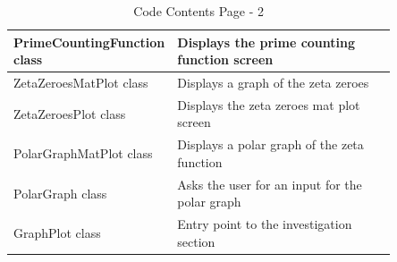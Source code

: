 \documentclass[12pt]{article}
\begin{document}
\begin{table}[ht]
\begin{tabular}{|p{0.26\linewidth}|p{0.59\linewidth}|}
    \hline
    PrimeCountingFunction class & Displays the prime counting function screen\\
    \hline
    ZetaZeroesMatPlot class & Displays a graph of the zeta zeroes\\
    \hline
    ZetaZeroesPlot class & Displays the zeta zeroes mat plot screen\\
    \hline
    PolarGraphMatPlot class & Displays a polar graph of the zeta function\\
    \hline
    PolarGraph class & Asks the user for an input for the polar graph\\
    \hline
    GraphPlot class & Entry point to the investigation section\\
    \hline
    \end{tabular}
    \caption{Code Contents Page - 2}
\end{table}
\clearpage
\end{document}
